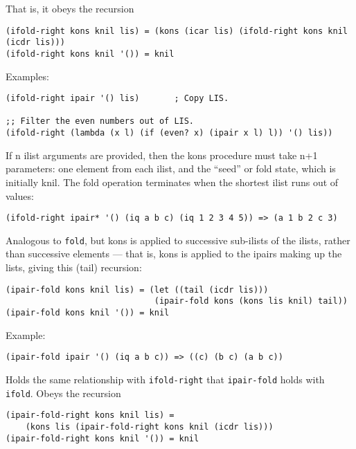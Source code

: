 \begin{description}
That is, it obeys the recursion

\begin{verbatim}
(ifold-right kons knil lis) = (kons (icar lis) (ifold-right kons knil (icdr lis)))
(ifold-right kons knil '()) = knil
\end{verbatim}

Examples:

\begin{verbatim}
(ifold-right ipair '() lis)       ; Copy LIS.

;; Filter the even numbers out of LIS.
(ifold-right (lambda (x l) (if (even? x) (ipair x l) l)) '() lis))
\end{verbatim}

If n ilist arguments are provided, then the kons procedure must take n+1
parameters: one element from each ilist, and the ``seed'' or fold state,
which is initially knil. The fold operation terminates when the shortest
ilist runs out of values:

\begin{verbatim}
(ifold-right ipair* '() (iq a b c) (iq 1 2 3 4 5)) => (a 1 b 2 c 3)
\end{verbatim}
\item[ \href{}{} \texttt{ipair-fold} kons knil ilist\textsubscript{1}
ilist\textsubscript{2} \ldots{} -\textgreater{} value ]
Analogous to \texttt{fold}, but kons is applied to successive sub-ilists
of the ilists, rather than successive elements --- that is, kons is
applied to the ipairs making up the lists, giving this (tail) recursion:

\begin{verbatim}
(ipair-fold kons knil lis) = (let ((tail (icdr lis)))
                              (ipair-fold kons (kons lis knil) tail))
(ipair-fold kons knil '()) = knil
\end{verbatim}

Example:

\begin{verbatim}
(ipair-fold ipair '() (iq a b c)) => ((c) (b c) (a b c))
\end{verbatim}
\item[ \href{}{} \texttt{ipair-fold-right} kons knil
ilist\textsubscript{1} ilist\textsubscript{2} \ldots{} -\textgreater{}
value ]
Holds the same relationship with \texttt{ifold-right} that
\texttt{ipair-fold} holds with \texttt{ifold}. Obeys the recursion

\begin{verbatim}
(ipair-fold-right kons knil lis) = 
    (kons lis (ipair-fold-right kons knil (icdr lis)))
(ipair-fold-right kons knil '()) = knil
\end{verbatim}


\end{description}
